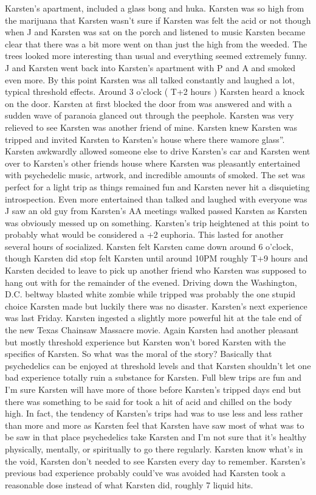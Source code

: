 \documentclass[12pt]{book}
\begin{document}
Karsten's apartment, included a glass bong and huka. Karsten was so high from the marijuana that Karsten wasn't sure if Karsten was felt the acid or not though when J and Karsten was sat on the porch and listened to music Karsten became clear that there was a bit more went on than just the high from the weeded. The trees looked more interesting than usual and everything seemed extremely funny. J and Karsten went back into Karsten's apartment with P and A and smoked even more. By this point Karsten was all talked constantly and laughed a lot, typical threshold effects. Around 3 o'clock ( T+2 hours ) Karsten heard a knock on the door. Karsten at first blocked the door from was answered and with a sudden wave of paranoia glanced out through the peephole. Karsten was very relieved to see Karsten was another friend of mine. Karsten knew Karsten was tripped and invited Karsten to Karsten's house where there wamore glass''. Karsten awkwardly allowed someone else to drive Karsten's car and Karsten went over to Karsten's other friends house where Karsten was pleasantly entertained with psychedelic music, artwork, and incredible amounts of smoked. The set was perfect for a light trip as things remained fun and Karsten never hit a disquieting introspection. Even more entertained than talked and laughed with everyone was J saw an old guy from Karsten's AA meetings walked passed Karsten as Karsten was obviously messed up on something. Karsten's trip heightened at this point to probably what would be considered a +2 euphoria. This lasted for another several hours of socialized. Karsten felt Karsten came down around 6 o'clock, though Karsten did stop felt Karsten until around 10PM roughly T+9 hours and Karsten decided to leave to pick up another friend who Karsten was supposed to hang out with for the remainder of the evened. Driving down the Washington, D.C. beltway blasted white zombie while tripped was probably the one stupid choice Karsten made but luckily there was no disaster. Karsten's next experience was last Friday. Karsten ingested a slightly more powerful hit at the tale end of the new Texas Chainsaw Massacre movie. Again Karsten had another pleasant but mostly threshold experience but Karsten won't bored Karsten with the specifics of Karsten. So what was the moral of the story? Basically that psychedelics can be enjoyed at threshold levels and that Karsten shouldn't let one bad experience totally ruin a substance for Karsten. Full blew trips are fun and I'm sure Karsten will have more of those before Karsten's tripped days end but there was something to be said for took a hit of acid and chilled on the body high. In fact, the tendency of Karsten's trips had was to use less and less rather than more and more as Karsten feel that Karsten have saw most of what was to be saw in that place psychedelics take Karsten and I'm not sure that it's healthy physically, mentally, or spiritually to go there regularly. Karsten know what's in the void, Karsten don't needed to see Karsten every day to remember. Karsten's previous bad experience probably could've was avoided had Karsten took a reasonable dose instead of what Karsten did, roughly 7 liquid hits.
\end{document}
